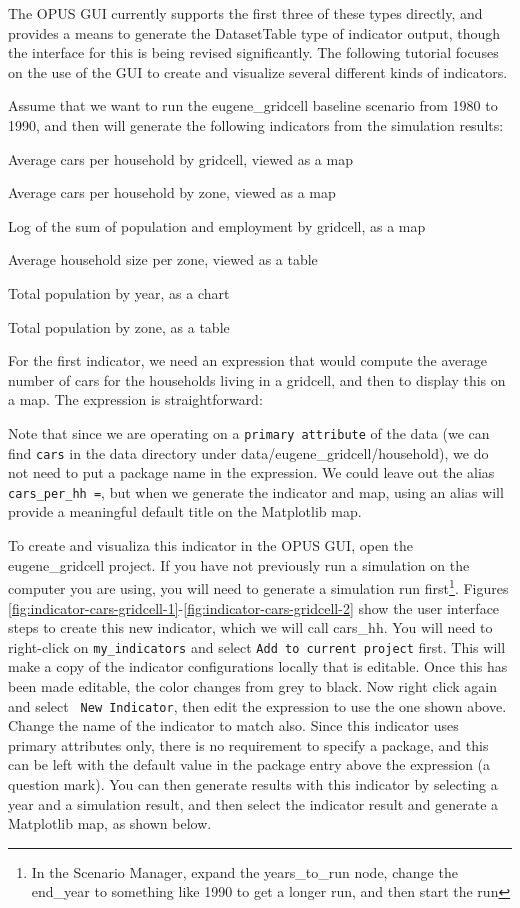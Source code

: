 The OPUS GUI currently supports the first three of these types directly, and provides a means to generate the DatasetTable type of indicator output, though the interface for this is being revised significantly.  The following tutorial focuses on the use of the GUI to create and visualize several different kinds of indicators.  

Assume that we want to run the eugene\_gridcell baseline scenario from 1980 to 1990, and then will generate the following indicators from the simulation results:

\squishlist
\item Average cars per household by gridcell, viewed as a map
\item Average cars per household by zone, viewed as a map
\item Log of the sum of population and employment by gridcell, as a map
\item Average household size per zone, viewed as a table
\item Total population by year, as a chart
\item Total population by zone, as a table
\squishend

For the first indicator, we need an expression that would compute the average number of cars for the households living in a gridcell, and then to display this on a map.  The expression is straightforward:


Note that since we are operating on a \verb#primary attribute# of the data (we can find \verb#cars# in the data directory under data/eugene\_gridcell/household), we do not need to put a package name in the expression.  We could leave out the alias \verb#cars_per_hh =#, but when we generate the indicator and map, using an alias will provide a meaningful default title on the Matplotlib map.

To create and visualiza this indicator in the OPUS GUI, open the eugene\_gridcell project.  If you have not previously run a simulation on the computer you are using, you will need to generate a simulation run first\footnote{In the Scenario Manager, expand the years\_to\_run node, change the end\_year to something like 1990 to get a longer run, and then start the run}.   Figures \ref{fig:indicator-cars-gridcell-1}-\ref{fig:indicator-cars-gridcell-2} show the user interface steps to create this new indicator, which we will call cars\_hh.  You will need to right-click on \verb#my_indicators# and select \verb#Add to current project# first.  This will make a copy of the indicator configurations locally that is editable.  Once this has been made editable, the color changes from grey to black.  Now right click again and select \verb# New Indicator#, then edit the expression to use the one shown above.  Change the name of the indicator to match also. Since this indicator uses primary attributes only, there is no requirement to specify a package, and this can be left with the default value in the package entry above the expression (a question mark).  You can then generate results with this indicator by selecting a year and a simulation result, and then select the indicator result and generate a Matplotlib map, as shown below.

